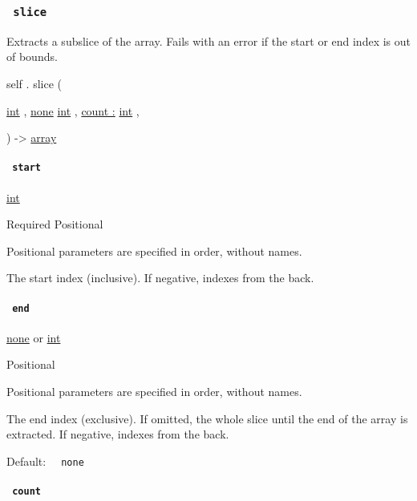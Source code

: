 \subsubsection{\texorpdfstring{\texttt{\ slice\ }}{ slice }}\label{definitions-slice}

Extracts a subslice of the array. Fails with an error if the start or
end index is out of bounds.

self { . } { slice } (

{ \href{/docs/reference/foundations/int/}{int} , } {
\href{/docs/reference/foundations/none/}{none}
\href{/docs/reference/foundations/int/}{int} , } {
\hyperref[definitions-slice-parameters-count]{count :}
\href{/docs/reference/foundations/int/}{int} , }

) -\textgreater{} \href{/docs/reference/foundations/array/}{array}

\paragraph{\texorpdfstring{\texttt{\ start\ }}{ start }}\label{definitions-slice-start}

\href{/docs/reference/foundations/int/}{int}

{Required} {{ Positional }}

\label{definitions-slice-start-positional-tooltip}
Positional parameters are specified in order, without names.

The start index (inclusive). If negative, indexes from the back.

\paragraph{\texorpdfstring{\texttt{\ end\ }}{ end }}\label{definitions-slice-end}

\href{/docs/reference/foundations/none/}{none} {or}
\href{/docs/reference/foundations/int/}{int}

{{ Positional }}

\label{definitions-slice-end-positional-tooltip}
Positional parameters are specified in order, without names.

The end index (exclusive). If omitted, the whole slice until the end of
the array is extracted. If negative, indexes from the back.

Default: \texttt{\ }{\texttt{\ none\ }}\texttt{\ }

\paragraph{\texorpdfstring{\texttt{\ count\ }}{ count }}\label{definitions-slice-count}


